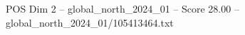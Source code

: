 \begin{textsample}{POS Dim 2 – global\_north\_2024\_01 – Score 28.00 – global\_north\_2024\_01/105413464.txt}
\end{textsample}
